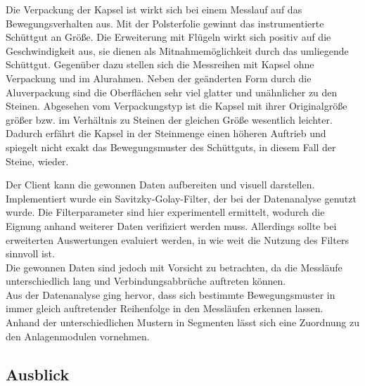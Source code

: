 Die Verpackung der Kapsel ist wirkt sich bei einem Messlauf auf das Bewegungsverhalten aus. Mit der Polsterfolie gewinnt das instrumentierte Schüttgut an Größe. Die Erweiterung mit Flügeln wirkt sich positiv auf die Geschwindigkeit aus, sie dienen als Mitnahmemöglichkeit durch das umliegende Schüttgut. Gegenüber dazu stellen sich die Messreihen mit Kapsel ohne Verpackung und im Alurahmen. Neben der geänderten Form durch die Aluverpackung sind die Oberflächen sehr viel glatter und unähnlicher zu den Steinen. 
Abgesehen vom Verpackungstyp ist die Kapsel mit ihrer Originalgröße größer bzw. im Verhältnis zu Steinen der gleichen Größe wesentlich leichter. Dadurch erfährt die Kapsel in der Steinmenge einen höheren Auftrieb und spiegelt nicht exakt das Bewegungsmuster des Schüttguts, in diesem Fall der Steine, wieder. 

Der Client kann die gewonnen Daten aufbereiten und visuell darstellen. Implementiert wurde ein Savitzky-Golay-Filter, der bei der Datenanalyse genutzt wurde. Die Filterparameter sind hier experimentell ermittelt, wodurch die Eignung anhand weiterer Daten verifiziert werden muss. Allerdings sollte bei erweiterten Auswertungen evaluiert werden, in wie weit die Nutzung des Filters sinnvoll ist. \\
Die gewonnen Daten sind jedoch mit Vorsicht zu betrachten, da die Messläufe unterschiedlich lang und Verbindungsabbrüche auftreten können. \\
Aus der Datenanalyse ging hervor, dass sich bestimmte Bewegungsmuster in immer gleich auftretender Reihenfolge in den Messläufen erkennen lassen. Anhand der unterschiedlichen Mustern in Segmenten lässt sich eine Zuordnung zu den Anlagenmodulen vornehmen. 

\subsection{Ausblick}

